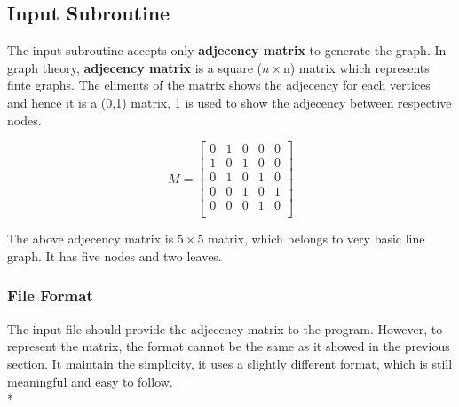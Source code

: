 \documentclass[11pt]{article}
\begin{document}
\subsection{Input Subroutine}

The input subroutine accepts only \textbf{adjecency matrix} to generate the graph. In graph theory, \textbf{adjecency matrix} is a square \big($n\times$n) matrix which represents finte graphs. The eliments of the matrix shows the adjecency for each vertices and hence it is a \big(0,1) matrix, 1 is used to show the adjecency between respective nodes. 

\[
   M=
  \left[ {\begin{array}{ccccc}
   0 & 1 & 0 & 0 & 0 \\
   1 & 0 & 1 & 0 & 0 \\
   0 & 1 & 0 & 1 & 0 \\
   0 & 0 & 1 & 0 & 1 \\
   0 & 0 & 0 & 1 & 0 \\
  \end{array} } \right]
\]

\vspace{5mm}

\noindent
The above adjecency matrix is  $5\times5$ matrix, which belongs to very basic line graph. It has five nodes and two leaves.\\ 


\subsubsection{File Format}

The input file should provide the adjecency matrix to the program. However, to represent the matrix, the format cannot be the same as it showed in the previous section. It maintain the simplicity, it uses a slightly different format, which is still meaningful and easy to follow.\\* 
\end{document}
